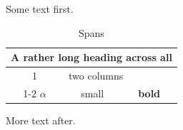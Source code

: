 \documentclass{article}
\begin{document}
Some text first.

\begin{table}[h]
\centering
\begin{tabular}{|c|c|c|}
\hline\hline
\multicolumn{3}{|c|}{A rather long heading across all} \\
\hline
1 & \multicolumn{2}{l|}{two columns} \\ \cline{1-2}
$\alpha$ & {\small small} & \textbf{bold} \\
\hline
\end{tabular}
\caption{Spans}
\end{table}
More text after.
\end{document}
